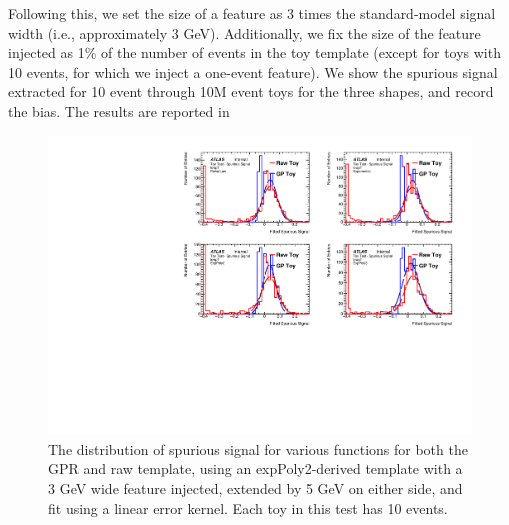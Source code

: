 Following this, we set the size of a feature as 3 times the standard-model signal width (i.e., approximately 3 GeV). Additionally, we fix the size of the feature injected as 1\% of the number of events in the toy template (except for toys with 10 events, for which we inject a one-event feature). We show the spurious signal extracted for 10 event through 10M event toys for the three shapes, and record the bias. The results are reported in \Tab{\ref{tab:SigSS}}
\begin{figure}  
\begin{center}
  \includegraphics[width=\textwidth]{figures/background/gpr/validation/linear/ToyTest_FitSigVals_lowpT_10_Sig}   
\caption{The distribution of spurious signal for various functions for both the GPR and raw template, using an expPoly2-derived template with a 3 GeV wide feature injected, extended by 5 GeV on either side, and fit using a linear error kernel. Each toy in this test has 10 events.}
\label{fig:linearkernel_lowpt_10_Sig}
\end{center}
\end{figure}

